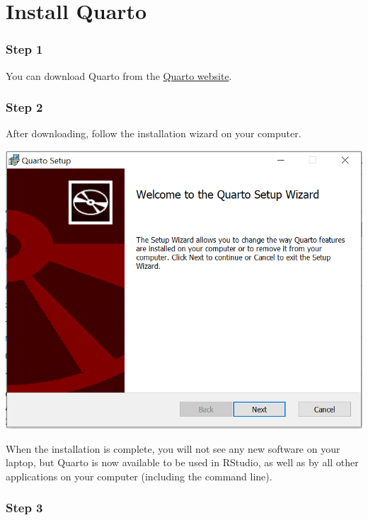 \documentclass[
  letterpaper,
  DIV=11,
  numbers=noendperiod]{scrreprt}
\begin{document}
\hypertarget{install-quarto}{%
\section{Install Quarto}\label{install-quarto}}

\hypertarget{step-1-2}{%
\subsubsection{Step 1}\label{step-1-2}}

You can download Quarto from the
\href{https://quarto.org/docs/get-started/}{Quarto website}.

\hypertarget{step-2-2}{%
\subsubsection{Step 2}\label{step-2-2}}

After downloading, follow the installation wizard on your computer.

\includegraphics{./images/paste-FE57875E.png}

When the installation is complete, you will not see any new software on
your laptop, but Quarto is now available to be used in RStudio, as well
as by all other applications on your computer (including the command
line).

\hypertarget{step-3-2}{%
\subsubsection{Step 3}\label{step-3-2}}
\end{document}
